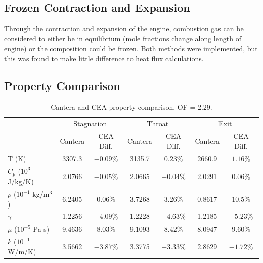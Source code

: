 \documentclass[11pt]{article}
\begin{document}
\subsection{Frozen Contraction and Expansion}

Through the contraction and expansion of the engine, combustion gas can be considered to either be in equilibrium (mole fractions change along length of engine) or the composition could be frozen. Both methods were implemented, but this was found to make little difference to heat flux calculations.


\subsection{Property Comparison}

\begin{table}[H]
  \centering
  \caption{Cantera and CEA property comparison, OF = 2.29.}
  \begin{tabular}{l c c c c c c}
    \toprule
    & \multicolumn{2}{c}{Stagnation} & \multicolumn{2}{c}{Throat} & \multicolumn{2}{c}{Exit} \\
    \cmidrule(lr){2-3} \cmidrule(lr){4-5} \cmidrule(lr){6-7}
    & Cantera & CEA Diff. & Cantera & CEA Diff. & Cantera & CEA Diff. \\
    \midrule
    T (K) & 3307.3 & $-0.09\%$ & 3135.7 & $0.23\%$ & 2660.9 & $1.16\%$ \\
    $C_p$ ($10^3$ J/kg/K) & 2.0766 & $-0.05\%$ & 2.0665 & $-0.04\%$ & 2.0291 & $0.06\%$ \\
    $\rho$ ($10^{-1}$ kg/m$^3$) & 6.2405 & $0.06\%$ & 3.7268 & $3.26\%$ & 0.8617 & $10.5\%$\\
    $\gamma$ & 1.2256 & $-4.09\%$ & 1.2228 & $-4.63\%$ & 1.2185 & $-5.23\%$ \\
    $\mu$ ($10^{-5}$ Pa s) & 9.4636 & $8.03\%$ & 9.1093 & $8.42\%$ & 8.0947 & $9.60\%$ \\
    $k$ ($10^{-1}$ W/m/K) & 3.5662 & $-3.87\%$ & 3.3775 & $-3.33\%$ & 2.8629 & $-1.72\%$\\
    \bottomrule
  \end{tabular}
\end{table}
\end{document}
